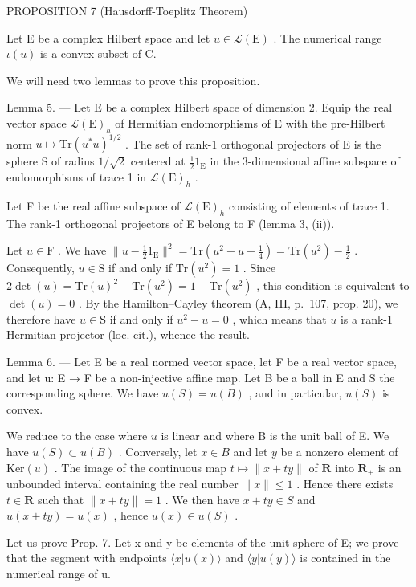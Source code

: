 PROPOSITION 7 (Hausdorff-Toeplitz Theorem)

Let E be a complex Hilbert space and let \(u \in \mathcal{L}(\mathrm{E})\) . The numerical range \(\iota(u)\) is a convex subset of C.

We will need two lemmas to prove this proposition.

Lemma 5. --- Let E be a complex Hilbert space of dimension 2. Equip the real vector space \(\mathcal{L}(\mathrm{E})_h\) of Hermitian endomorphisms of E with the pre-Hilbert norm \(u \mapsto \mathrm{Tr}(u^* u)^{1/2}\) . The set of rank-1 orthogonal projectors of E is the sphere S of radius \(1/\sqrt{2}\) centered at \(\frac{1}{2} 1_{\mathrm{E}}\) in the 3-dimensional affine subspace of endomorphisms of trace 1 in \(\mathcal{L}(\mathrm{E})_h\) .

Let F be the real affine subspace of \(\mathcal{L}(\mathrm{E})_h\) consisting of elements of trace 1. The rank-1 orthogonal projectors of E belong to F (lemma 3, (ii)).

Let \(u \in \mathrm{F}\) . We have \(\| u - \frac{1}{2} 1_{\mathrm{E}} \|^{2} = \mathrm{Tr}(u^{2} - u + \frac{1}{4}) = \mathrm{Tr}(u^{2}) - \frac{1}{2}\) . Consequently, \(u \in \mathrm{S}\) if and only if \(\mathrm{Tr}(u^{2}) = 1\) . Since \(2\det(u) = \mathrm{Tr}(u)^{2} - \mathrm{Tr}(u^{2}) = 1 - \mathrm{Tr}(u^{2})\) , this condition is equivalent to \(\det(u) = 0\) . By the Hamilton--Cayley theorem (A, III, p.~107, prop. 20), we therefore have \(u \in \mathrm{S}\) if and only if \(u^{2} - u = 0\) , which means that \(u\) is a rank-1 Hermitian projector (loc. cit.), whence the result.

Lemma 6. --- Let E be a real normed vector space, let F be a real vector space, and let u: E → F be a non-injective affine map. Let B be a ball in E and S the corresponding sphere. We have \(u(S) = u(B)\) , and in particular, \(u(S)\) is convex.

We reduce to the case where \(u\) is linear and where B is the unit ball of E. We have \(u(S) \subset u(B)\) . Conversely, let \(x \in B\) and let \(y\) be a nonzero element of \(\text{Ker}(u)\) . The image of the continuous map \(t \mapsto \|x + ty\|\) of \(\mathbf{R}\) into \(\mathbf{R}_+\) is an unbounded interval containing the real number \(\|x\| \leqslant 1\) . Hence there exists \(t \in \mathbf{R}\) such that \(\|x + ty\| = 1\) . We then have \(x + ty \in S\) and \(u(x + ty) = u(x)\) , hence \(u(x) \in u(S)\) .

Let us prove Prop. 7. Let x and y be elements of the unit sphere of E; we prove that the segment with endpoints \(\langle x|u(x)\rangle\) and \(\langle y|u(y)\rangle\) is contained in the numerical range of u.

